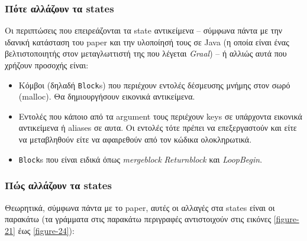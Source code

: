 
\subsubsection{Πότε αλλάζουν τα states}

Οι περιπτώσεις που επειρεάζονται τα state αντικείμενα – σύμφωνα πάντα με την
ιδανική κατάσταση του paper\cite{standler2014partial} και την υλοποίησή τους σε
Java (η οποία είναι ένας βελτιστοποιητής στον μεταγλωττιστή της που λέγεται
\textit{Graal}) – ή αλλιώς αυτά που χρήζουν προσοχής είναι:

\begin{itemize}

\item Κόμβοι (δηλαδή \texttt{Block}s) που περιέχουν εντολές δέσμευσης μνήμης
στον σωρό (malloc). Θα δημιουργήσουν εικονικά αντικείμενα.

\item Εντολές που κάποιο από τα argument τους περιέχουν keys σε υπάρχοντα
εικονικά αντικείμενα ή aliases σε αυτα. Οι εντολές τότε πρέπει να επεξεργαστούν
και είτε να μεταβληθούν είτε να αφαιρεθούν από τον κώδικα ολοκληρωτικά.

\item \texttt{Block}s που είναι ειδικά όπως \textit{mergeblock}
\textit{Returnblock} και \textit{LoopBegin}.

\end{itemize}


\subsubsection{Πώς αλλάζουν τα states}

Θεωρητικά, σύμφωνα πάντα με το paper, αυτές οι αλλαγές στα states είναι οι
παρακάτω (τα γράμματα στις παρακάτω περιγραφές αντιστοιχούν στις εικόνες
\ref{figure-21} έως \ref{figure-24}):

